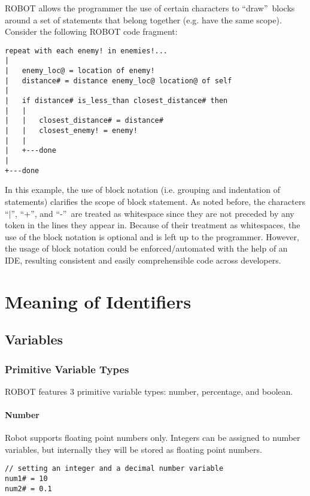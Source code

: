 \documentclass[a4paper]{article}
\newcommand{\og}{``}
\newcommand{\fg}{''}
\begin{document}
ROBOT allows the programmer the use of certain characters to \og draw\fg\ blocks around a set of statements that belong together (e.g. have the same scope).  Consider the following ROBOT code fragment: 

\begin{verbatim}
repeat with each enemy! in enemies!...
|
|   enemy_loc@ = location of enemy!
|   distance# = distance enemy_loc@ location@ of self
|
|   if distance# is_less_than closest_distance# then
|   |
|   |   closest_distance# = distance#
|   |   closest_enemy! = enemy!
|   |
|   +---done
|
+---done
\end{verbatim}

In this example, the use of block notation (i.e. grouping and indentation of statements) clarifies the scope of block statement.  As noted before, the characters \og$\vert$\fg, \og+\fg, and \og-\fg\ are treated as whitespace since they are not preceded by any token in the lines they appear in.  Because of their treatment as whitespaces, the use of the block notation is optional and is left up to the programmer.  However, the usage of block notation could be enforced/automated with the help of an IDE, resulting consistent and easily comprehensible code across developers.

\section{Meaning of Identifiers}

\subsection{Variables}

\subsubsection{Primitive Variable Types}

ROBOT features 3 primitive variable types: number, percentage, and boolean.

\paragraph{Number}

Robot supports floating point numbers only.  Integers can be assigned to number variables, but internally they will be stored as floating point numbers.

\begin{verbatim}
// setting an integer and a decimal number variable
num1# = 10
num2# = 0.1
\end{verbatim}
\end{document}

